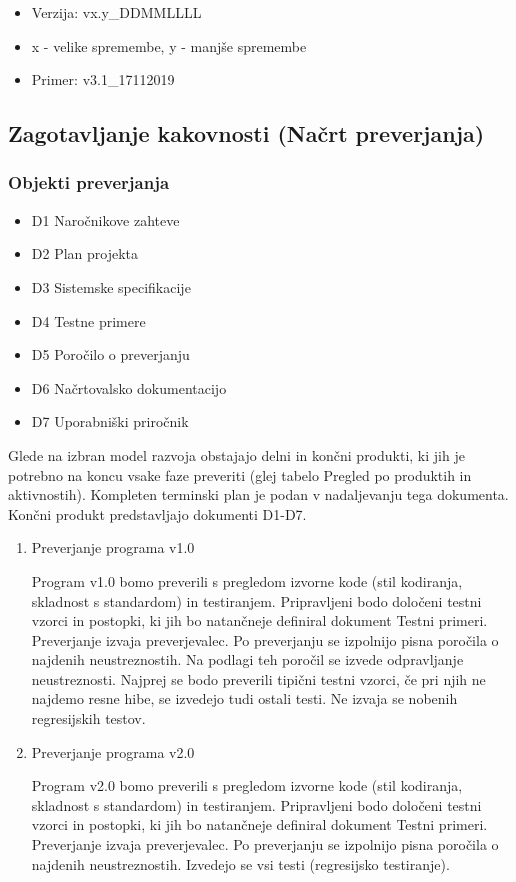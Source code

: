\documentclass[a4paper,12pt]{article}
\begin{document}
				\begin{itemize}
					\item Verzija: vx.y\_DDMMLLLL
					\item x - velike spremembe, y - manjše spremembe
					\item Primer: v3.1\_17112019
				\end{itemize}

	\subsection{Zagotavljanje kakovnosti (Načrt preverjanja)}

		\subsubsection{Objekti preverjanja}

			\begin{itemize}
				\item D1 	Naročnikove zahteve
				\item D2 	Plan projekta
				\item D3 	Sistemske specifikacije
				\item D4 	Testne primere
				\item D5 	Poročilo o preverjanju
				\item D6 	Načrtovalsko dokumentacijo
				\item D7 	Uporabniški priročnik	
			\end{itemize}

			Glede na izbran model razvoja obstajajo delni in končni produkti, 
			ki jih je potrebno na koncu vsake faze preveriti (glej tabelo 
			Pregled po produktih in aktivnostih). Kompleten terminski plan 
			je podan v nadaljevanju tega dokumenta. Končni produkt 
			predstavljajo dokumenti D1-D7.

			\begin{enumerate}[label=\alph*)]
				\item Preverjanje programa v1.0

					Program v1.0 bomo preverili s pregledom izvorne kode 
					(stil kodiranja, skladnost s standardom) in testiranjem. 
					Pripravljeni bodo določeni testni vzorci in postopki, 
					ki jih bo natančneje definiral dokument Testni primeri. 
					Preverjanje izvaja preverjevalec. Po preverjanju se izpolnijo 
					pisna poročila o najdenih neustreznostih. Na podlagi teh poročil 
					se izvede odpravljanje neustreznosti. Najprej se bodo preverili 
					tipični testni vzorci, če pri njih ne najdemo resne hibe, se 
					izvedejo tudi ostali testi. Ne izvaja se nobenih regresijskih testov.
				\item Preverjanje programa v2.0

					Program v2.0 bomo preverili s pregledom izvorne kode 
					(stil kodiranja, skladnost s standardom) in testiranjem. Pripravljeni 
					bodo določeni testni vzorci in postopki, ki jih bo natančneje definiral 
					dokument Testni primeri. Preverjanje izvaja preverjevalec. Po preverjanju 
					se izpolnijo pisna poročila o najdenih neustreznostih. Izvedejo se vsi 
					testi (regresijsko testiranje).	
			\end{enumerate}
\end{document}
